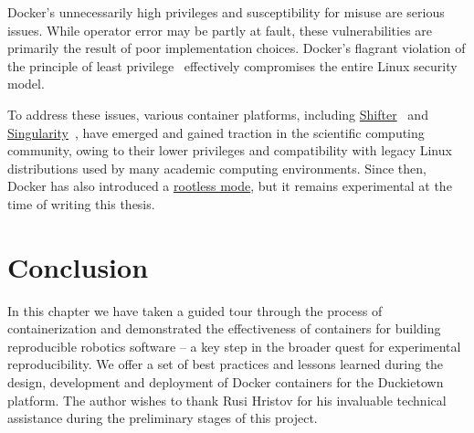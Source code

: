 \documentclass[12pt,initial,twoside,maitrise]{dms}
\numberwithin{equation}{section}
\numberwithin{table}{chapter}
\numberwithin{figure}{chapter}
\begin{document}
Docker's unnecessarily high privileges and susceptibility for misuse are serious issues. While operator error may be partly at fault, these vulnerabilities are primarily the result of poor implementation choices. Docker's flagrant violation of the principle of least privilege~\citep{saltzer1975protection} effectively compromises the entire Linux security model.

To address these issues, various container platforms, including \href{https://docs.nersc.gov/programming/shifter/overview/}{Shifter}~\citep{gerhardt2017shifter} and \href{https://sylabs.io/docs/}{Singularity}~\citep{kurtzer2017singularity}, have emerged and gained traction in the scientific computing community, owing to their lower privileges and compatibility with legacy Linux distributions used by many academic computing environments. Since then, Docker has also introduced a \href{https://engineering.docker.com/2019/02/experimenting-with-rootless-docker/}{rootless mode}, but it remains experimental at the time of writing this thesis.

\section{Conclusion}

In this chapter we have taken a guided tour through the process of containerization and demonstrated the effectiveness of containers for building reproducible robotics software -- a key step in the broader quest for experimental reproducibility. We offer a set of best practices and lessons learned during the design, development and deployment of Docker containers for the Duckietown~\citep{paull2017duckietown} platform. The author wishes to thank Rusi Hristov for his invaluable technical assistance during the preliminary stages of this project.
\end{document}
